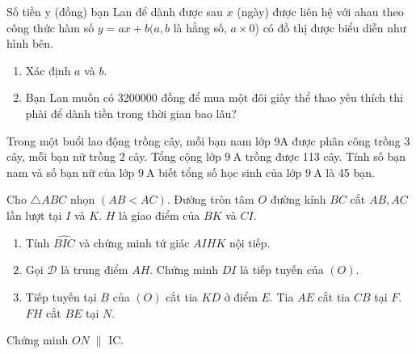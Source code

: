 \begin{bt}[1,0 điểm][][Nguồn:]
	Số tiền y (đồng) bạn Lan để dành được sau $x$ (ngày) được liên hệ với ahau theo công thức hàm số $y=a x+b(a, b$ là hằng số, $a \times 0$) có đồ thị được biểu diễn như hình bên.
	\begin{enumerate}
		\item Xác định $a$ và $b$.
		\item Bạn Lan muốn có 3200000 đồng để mua một đôi giày thể thao yêu thích thi phài để dành tiền trong thời gian bao lâu?
	\end{enumerate}
	\loigiai{}
\end{bt}
\begin{bt}[1,5 điểm]
	Trong một buổi lao động trồng cây, mỗi bạn nam lớp 9A được phân công trồng 3 cây, mỗi bạn nữ trồng 2 cây. Tổng cộng lớp $9\mathrm{~A}$ trồng được 113 cây. Tính số bạn nam và số bạn nữ của lớp $9\mathrm{~A}$ biết tổng số học sinh của lớp $9\mathrm{~A}$ là 45 bạn.
	\loigiai{}
\end{bt}
\begin{bt}[2,5 điểm]
	Cho $\triangle ABC$ nhọn $(AB < AC)$. Đường tròn tâm $O$ đường kính $BC$ cắt $AB, AC$ lần lượt tại $I$ và $K$. $H$ là giao điểm của $BK$ và $CI$.
	\begin{enumerate}
		\item Tính $\widehat{BIC}$ và chứng minh tứ giác $AIHK$ nội tiếp.
		\item Gọi $\mathscr{D}$ là trung điểm $AH$. Chứng minh $DI$ là tiếp tuyến của $(O)$.
		\item Tiếp tuyến tại $B$ của $(O)$ cắt tia $KD$ ở điểm $E$. Tia $AE$ cắt tia $CB$ tại $F$. $FH$ cắt $BE$ tại $N$.
	\end{enumerate}
	Chứng minh  $ON \; \parallel$ IC.
	\loigiai{}
\end{bt}

\label{\x}